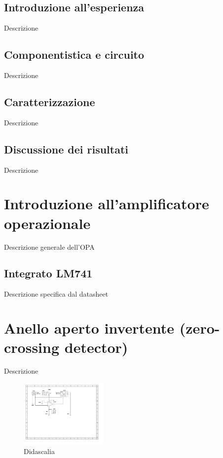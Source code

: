 \documentclass[journal]{IEEEtran}
\begin{document}
\subsection{\textbf{Introduzione all'esperienza}}
Descrizione

\subsection{\textbf{Componentistica e circuito}}
Descrizione

\subsection{\textbf{Caratterizzazione}}
Descrizione

\subsection{\textbf{Discussione dei risultati}}
Descrizione


\section{\textbf{Introduzione all'amplificatore operazionale}}
Descrizione generale dell'OPA %

\subsection{\textbf{Integrato LM741}}
Descrizione specifica dal datasheet


\section{\textbf{Anello aperto invertente (zero-crossing detector)}} %
Descrizione

\begin{figure}[H]%
\begin {center}
\includegraphics[width=0.38\textwidth]{sch-simulations/output/OPA-open-loop-inverting.pdf}
\caption{Didascalia}
\label{fig:oscilloscope}
\end {center}
\end{figure}
\end{document}

